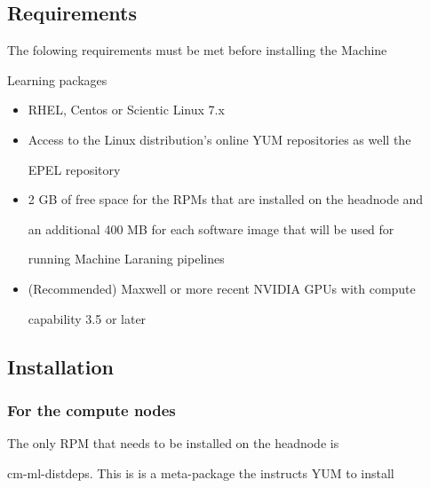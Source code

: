 \documentclass[]{article}
\providecommand{\tightlist}{%

  \setlength{\itemsep}{0pt}\setlength{\parskip}{0pt}}
\begin{document}
\subsection{Requirements}\label{requirements}



The folowing requirements must be met before installing the Machine

Learning packages



\begin{itemize}

\tightlist

\item

  RHEL, Centos or Scientic Linux 7.x

\item

  Access to the Linux distribution's online YUM repositories as well the

  EPEL repository

\item

  2 GB of free space for the RPMs that are installed on the headnode and

  an additional 400 MB for each software image that will be used for

  running Machine Laraning pipelines

\item

  (Recommended) Maxwell or more recent NVIDIA GPUs with compute

  capability 3.5 or later

\end{itemize}



\subsection{Installation}\label{installation}



\subsubsection{For the compute nodes}\label{for-the-compute-nodes}



The only RPM that needs to be installed on the headnode is

cm-ml-distdeps. This is is a meta-package the instructs YUM to install
\end{document}
